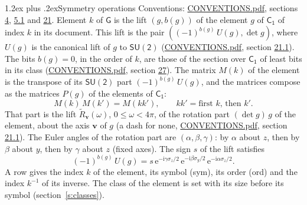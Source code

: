 \documentclass[10pt,a4paper]{article}
\makeatletter
\renewcommand\section{\@startsection{section}{1}{\z@}{-3ex plus -1ex minus -.2ex}%
  {1.2ex plus .2ex}{\normalfont\large\sffamily\bfseries\color{parttitle}}}
\numberwithin{equation}{section}
\newcommand{\grp}[1]{\mathsf{#1}}
\newcommand{\vv}{\mathbf{v}}
\newcommand{\iunit}{\mathrm{i}}
\newcommand{\expe}{\mathrm{e}}
\newcommand{\lift}[1]{\tilde{#1}}
\newcommand{\pauli}[1]{\sigma_{#1}}
\makeatother
\begin{document}
\section{Symmetry operations}\label{s:elements}
Conventions: \href{../../CONVENTIONS.pdf}{CONVENTIONS.pdf}, sections \href{../../../rotation/CONVENTIONS.pdf\#conv.4}{4}, \href{../../../rotation/CONVENTIONS.pdf\#conv.5.1}{5.1} and \href{../../CONVENTIONS.pdf\#conv.21}{21}.
\leavevmode\label{n:index.element}\label{n:element.g}\label{n:function.section}Element $k$ of $\grp{G}$ is the lift $(g, b(g))$ of the element $g$ of \href{../../../rotation/data/pdf/C1.pdf}{$\grp{C_{1}}$} of index $k$ in its document. This lift is the pair $((-1)^{b(g)}\,U(g), \det g)$, where $U(g)$ is the canonical lift of $g$ to $\grp{SU(2)}$ (\href{../../CONVENTIONS.pdf}{CONVENTIONS.pdf}, section \href{../../CONVENTIONS.pdf\#conv.21.1}{21.1}). The bits $b(g) = 0$, in the order of $k$, are those of the section over $\grp{C_{1}}$ of least bits in its class (\href{../../CONVENTIONS.pdf}{CONVENTIONS.pdf}, section \href{../../CONVENTIONS.pdf\#conv.27}{27}). \label{n:matrix.element.pin}\label{n:matrix.element}The matrix $M(k)$ of the element is the transpose of its $\grp{SU(2)}$ part $(-1)^{b(g)}\,U(g)$, and the matrices compose as the matrices $P(g)$ of the elements of $\grp{C_{1}}$:
\begin{equation}\label{e:mprod}M(k)\,M(k') = M(kk'),\qquad kk' = \text{first } k\text{, then } k'.\end{equation}
\leavevmode\label{n:angle.omega}\label{n:vector.axis}That part is the lift $\lift{R}_{\vv}(\omega)$, $0 \le \omega < 4\pi$, of the rotation part $(\det g)\,g$ of the element, about the axis $\vv$ of $g$ (a dash for none, \href{../../CONVENTIONS.pdf}{CONVENTIONS.pdf}, section \href{../../CONVENTIONS.pdf\#conv.21.1}{21.1}). \label{n:angle.euler.alpha}\label{n:angle.euler.beta}\label{n:angle.euler.gamma}\label{n:vector.coordinates}The Euler angles of the rotation part are $(\alpha,\beta,\gamma)$: by $\alpha$ about $z$, then by $\beta$ about $y$, then by $\gamma$ about $z$ (fixed axes). \label{n:local.euler.sign}The sign $s$ of the lift satisfies
\begin{equation}\label{e:euler}(-1)^{b(g)}\,U(g) = s\,\expe^{-\iunit\gamma\pauli{z}/2}\,\expe^{-\iunit\beta\pauli{y}/2}\,\expe^{-\iunit\alpha\pauli{z}/2}.\end{equation}
\leavevmode\label{n:index.element.inverse}\label{n:head.sym}\label{n:head.ord}A row gives the index $k$ of the element, its symbol (sym), its order (ord) and the index $k^{-1}$ of its inverse. \label{n:head.class}The class of the element is set with its size before its symbol (section~\ref{s:classes}).
\end{document}
